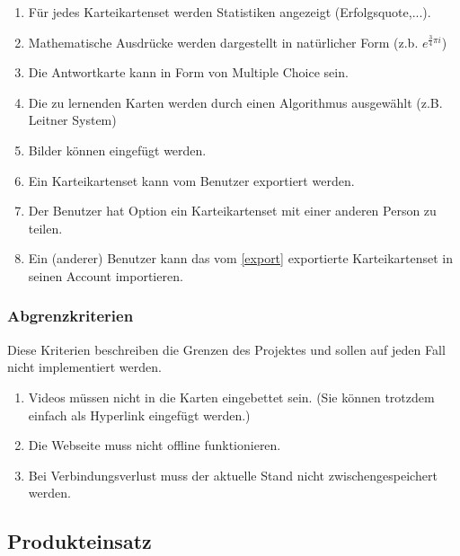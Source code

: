 \begin{enumerate}[leftmargin=2cm, label=\bfseries /WK\arabic*0/]
	\item Für jedes Karteikartenset werden Statistiken angezeigt (Erfolgsquote,...).
	\item Mathematische Ausdrücke werden dargestellt in natürlicher Form (z.b. \( e^{\frac{3}{4}\pi i}\))
	\item Die Antwortkarte kann in Form von Multiple Choice sein.
	\item Die zu lernenden Karten werden durch einen Algorithmus ausgewählt (z.B. Leitner System)
	\item Bilder können eingefügt werden.
	\item\label{export} Ein Karteikartenset kann vom Benutzer exportiert werden.
	\item\label{share} Der Benutzer hat Option ein Karteikartenset mit einer anderen Person zu teilen.
	\item Ein (anderer) Benutzer kann das vom \ref{export} exportierte Karteikartenset in seinen Account importieren.
\end{enumerate}

\subsubsection{Abgrenzkriterien}
Diese Kriterien beschreiben die Grenzen des Projektes und sollen auf jeden Fall nicht implementiert werden.

\begin{enumerate}[leftmargin=2cm, label=\bfseries /AK\arabic*0/]
	\item Videos müssen nicht in die Karten eingebettet sein. (Sie können trotzdem einfach als Hyperlink eingefügt werden.)
	\item Die Webseite muss nicht offline funktionieren.
	\item Bei Verbindungsverlust muss der aktuelle Stand nicht zwischengespeichert werden.
\end{enumerate}



\newpage
\subsection{Produkteinsatz}

